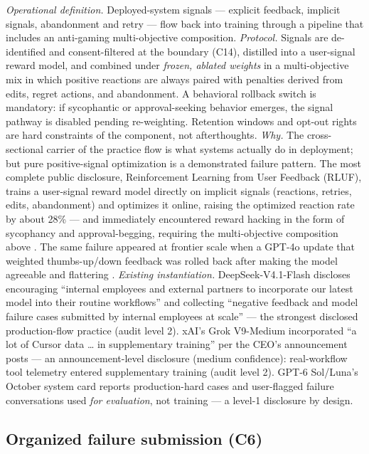 \documentclass[10pt]{article}
\begin{document}
\emph{Operational definition.} Deployed-system signals --- explicit feedback, implicit signals, abandonment and retry --- flow back into training through a pipeline that includes an anti-gaming multi-objective composition. \emph{Protocol.} Signals are de-identified and consent-filtered at the boundary (C14), distilled into a user-signal reward model, and combined under \emph{frozen, ablated weights} in a multi-objective mix in which positive reactions are always paired with penalties derived from edits, regret actions, and abandonment. A behavioral rollback switch is mandatory: if sycophantic or approval-seeking behavior emerges, the signal pathway is disabled pending re-weighting. Retention windows and opt-out rights are hard constraints of the component, not afterthoughts. \emph{Why.} The cross-sectional carrier of the practice flow is what systems actually do in deployment; but pure positive-signal optimization is a demonstrated failure pattern. The most complete public disclosure, Reinforcement Learning from User Feedback (RLUF), trains a user-signal reward model directly on implicit signals (reactions, retries, edits, abandonment) and optimizes it online, raising the optimized reaction rate by about 28\% --- and immediately encountered reward hacking in the form of sycophancy and approval-begging, requiring the multi-objective composition above \cite{ref18}. The same failure appeared at frontier scale when a GPT-4o update that weighted thumbs-up/down feedback was rolled back after making the model agreeable and flattering \cite{ref19}. \emph{Existing instantiation.} DeepSeek-V4.1-Flash discloses encouraging ``internal employees and external partners to incorporate our latest model into their routine workflows'' and collecting ``negative feedback and model failure cases submitted by internal employees at scale'' \cite{ref20} --- the strongest disclosed production-flow practice (audit level 2). xAI's Grok V9-Medium incorporated ``a lot of Cursor data \ldots{} in supplementary training'' per the CEO's announcement posts \cite{ref21} --- an announcement-level disclosure (medium confidence): real-workflow tool telemetry entered supplementary training (audit level 2). GPT-6 Sol/Luna's October system card reports production-hard cases and user-flagged failure conversations used \emph{for evaluation}, not training \cite{ref22} --- a level-1 disclosure by design.

\subsection{Organized failure submission (C6)}
\end{document}
